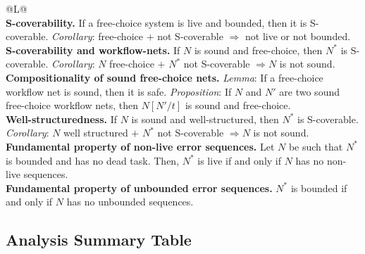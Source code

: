 \bigskip
\begin{tabularx}{\linewidth}{@{}L@{}}
\toprule
{}  \\
\midrule
\textbf{S-coverability.} If a free-choice system is live and bounded, then it is S-coverable. \emph{Corollary}: free-choice $+$ not S-coverable $\Rightarrow$ not live or not bounded. \\
\midrule
\textbf{S-coverability and workflow-nets.} If $N$ is sound and free-choice, then $N^*$ is S-coverable. \emph{Corollary}: $N$ free-choice $+$ $N^*$ not S-coverable $\Rightarrow N$ is not sound. \\
\midrule
\textbf{Compositionality of sound free-choice nets.} \emph{Lemma}: If a free-choice workflow net is sound, then it is safe. \emph{Proposition}: If $N$ and $N'$ are two sound free-choice workflow nets, then $N[N'/t]$ is sound and free-choice. \\
\midrule
\textbf{Well-structuredness.} If $N$ is sound and well-structured, then $N^*$ is S-coverable. \emph{Corollary}: $N$ well structured $+$ $N^*$ not S-coverable $\Rightarrow N$ is not sound. \\
\midrule
\textbf{Fundamental property of non-live error sequences.} Let $N$ be such that $N^*$ is bounded and has no dead task. Then, $N^*$ is live if and only if $N$ has no non-live sequences. \\
\midrule
\textbf{Fundamental property of unbounded error sequences.} $N^*$ is bounded if and only if $N$ has no unbounded sequences. \\
\bottomrule
\end{tabularx}

\subsection{Analysis Summary Table}

